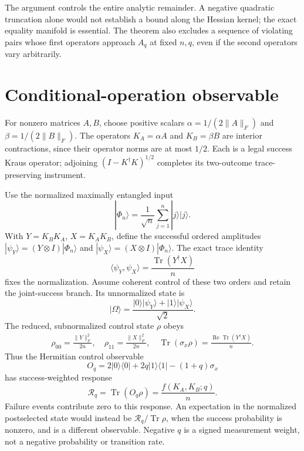 \documentclass[11pt,a4paper]{article}
\newcommand{\Tr}{\operatorname{Tr}}
\newcommand{\norm}[1]{\lVert #1\rVert_F}
\newcommand{\ip}[2]{\langle #1,#2\rangle}
\begin{document}
The argument controls the entire analytic remainder.
A negative quadratic truncation alone would not establish
a bound along the Hessian kernel; the exact equality
manifold is essential. The theorem also excludes a sequence
of violating pairs whose first operators approach \(A_q\)
at fixed \(n,q\), even if the second operators vary arbitrarily.

\section{Conditional-operation observable}
For nonzero matrices \(A,B\), choose positive scalars
\(\alpha=1/(2\norm{A})\) and \(\beta=1/(2\norm{B})\).
The operators \(K_A=\alpha A\) and \(K_B=\beta B\)
are interior contractions, since their operator norms
are at most \(1/2\).
Each is a legal success Kraus operator; adjoining
\((I-K^\dagger K)^{1/2}\) completes its two-outcome
trace-preserving instrument.

Use the normalized maximally entangled input
\begin{equation}
 |\Phi_n\rangle=\frac1{\sqrt n}\sum_{j=1}^n|j\rangle|j\rangle.
\end{equation}
With \(Y=K_BK_A\), \(X=K_AK_B\), define the successful
ordered amplitudes
\(|\psi_Y\rangle=(Y\otimes I)|\Phi_n\rangle\) and
\(|\psi_X\rangle=(X\otimes I)|\Phi_n\rangle\).
The exact trace identity
\begin{equation}
 \ip{\psi_Y}{\psi_X}=\frac{\Tr(Y^\dagger X)}n
 \label{eq:trace-map}
\end{equation}
fixes the normalization.
Assume coherent control of these two orders and retain the
joint-success branch. Its unnormalized state is
\begin{equation}
 |\Omega\rangle=\frac{|0\rangle|\psi_Y\rangle+
                          |1\rangle|\psi_X\rangle}{\sqrt2}.
\end{equation}
The reduced, subnormalized control state \(\rho\) obeys
\begin{equation}
 \begin{gathered}
 \rho_{00}=\frac{\norm{Y}^2}{2n},\quad
 \rho_{11}=\frac{\norm{X}^2}{2n},\quad
 \Tr(\sigma_x\rho)=\frac{\operatorname{Re}\Tr(Y^\dagger X)}n .
 \end{gathered}
\end{equation}
Thus the Hermitian control observable
\begin{equation}
 O_q=2|0\rangle\langle0|+2q|1\rangle\langle1|
                         -(1+q)\sigma_x
\end{equation}
has success-weighted response
\begin{equation}
 \mathcal R_q=\Tr(O_q\rho)
   =\frac{f(K_A,K_B;q)}n.
 \label{eq:observable}
\end{equation}
Failure events contribute zero to this response.
An expectation in the normalized postselected state would
instead be \(\mathcal R_q/\Tr\rho\), when the success
probability is nonzero, and is a different observable.
Negative \(q\) is a signed measurement weight, not a
negative probability or transition rate.
\end{document}

